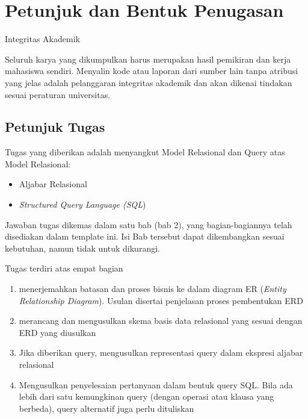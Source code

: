 \chapter{Petunjuk dan Bentuk Penugasan}
\begin{warnbox}{Integritas Akademik}
\begin{center}
  Seluruh karya yang dikumpulkan harus merupakan hasil pemikiran dan kerja
  mahasiswa sendiri. Menyalin kode atau laporan dari sumber lain tanpa atribusi
  yang jelas adalah pelanggaran integritas akademik dan akan dikenai tindakan sesuai
  peraturan universitas.
  \end{center}
\end{warnbox}

\section{Petunjuk Tugas}
Tugas yang diberikan adalah menyangkut Model Relasional dan Query atas Model Relasional:
\begin{itemize}
    \itemsep0em
     \item Aljabar Relasional
     \item \textit{Structured Query Language (SQL})
\end{itemize}

Jawaban tugas dikemas dalam satu bab (bab 2), yang bagian-bagiannya telah disediakan dalam template ini. Isi Bab tersebut dapat dikembangkan sesuai kebutuhan, namun tidak untuk dikurangi.

\begin{deliverablebox}{Tugas terdiri atas empat bagian}
  \begin{enumerate}
    \itemsep0em
    \item menerjemahkan batasan dan proses bisnis ke dalam diagram ER (\textit{Entity Relationship Diagram}). Usulan disertai penjelasan proses pembentukan ERD
     \item merancang dan mengusulkan skema basis data relasional yang sesuai dengan ERD yang diusulkan
     \item Jika diberikan query, mengusulkan  representasi query dalam  ekspresi aljabar relasional
     \item Mengusulkan penyelesaian pertanyaan dalam bentuk query SQL. Bila ada lebih dari satu kemungkinan query (dengan operasi atau klausa yang berbeda), query alternatif juga perlu dituliskan
\end{enumerate}  
\end{deliverablebox}

